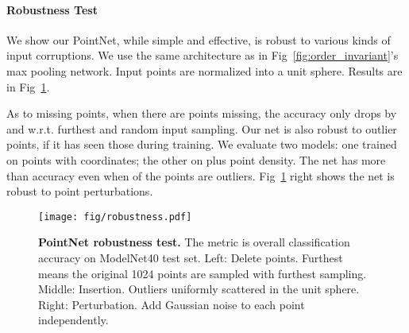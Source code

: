 \documentclass[10pt,twocolumn,letterpaper]{article}
\begin{document}
\paragraph{Robustness Test} We show our PointNet, while simple and effective, is robust to various kinds of input corruptions. We use the same architecture as in Fig~\ref{fig:order_invariant}'s max pooling network. Input points are normalized into a unit sphere. Results are in Fig~\ref{fig:robustness}.

As to missing points, when there are  points missing, the accuracy only drops by  and  w.r.t. furthest and random input sampling. Our net is also robust to outlier points, if it has seen those during training. We evaluate two models: one trained on points with  coordinates; the other on  plus point density. The net has more than  accuracy even when  of the points are outliers. Fig~\ref{fig:robustness} right shows the net is robust to point perturbations.

\begin{figure}
    \centering
    \texttt{[image: fig/robustness.pdf]}
    \caption{\textbf{PointNet robustness test.} The metric is overall classification accuracy on ModelNet40 test set. Left: Delete points. Furthest means the original 1024 points are sampled with furthest sampling. Middle: Insertion. Outliers uniformly scattered in the unit sphere. Right: Perturbation. Add Gaussian noise to each point independently.}
    \label{fig:robustness}
\end{figure}
\end{document}
